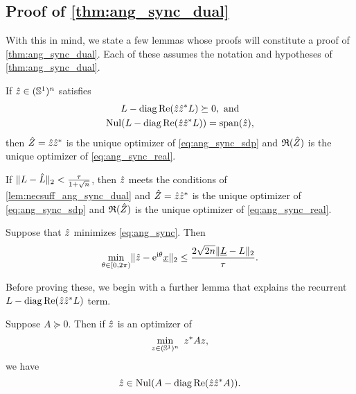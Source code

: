 \subsection{Proof of \cref{thm:ang_sync_dual}}
With this in mind, we state a few lemmas whose proofs will constitute a proof of \cref{thm:ang_sync_dual}.  Each of these assumes the notation and hypotheses of \cref{thm:ang_sync_dual}.

\begin{lemma}
  If $\hat{z} \in (\mathbb{S}^1)^n$ satisfies \begin{gather} L - \operatorname{diag}\operatorname{Re}(\hat{z} \hat{z}^* L) \succeq 0, \ \text{and} \label{eq:ang_sync_certificate} \\ \operatorname{Nul}(L - \operatorname{diag}\operatorname{Re}(\hat{z} \hat{z}^* L)) = \operatorname{span}(\hat{z}), \label{eq:ang_sync_nullspace} \end{gather} then $\hat{Z} = \hat{z} \hat{z}^*$ is the unique optimizer of \eqref{eq:ang_sync_sdp} and $\mathfrak{R}(\hat{Z})$ is the unique optimizer of \eqref{eq:ang_sync_real}.
  \label{lem:necsuff_ang_sync_dual}
\end{lemma}

\begin{lemma}
  If $\lVert L - \hat{L}\rVert_2 < \frac{\tau}{1 + \sqrt{n}}$, then $\hat{z}$ meets the conditions of \cref{lem:necsuff_ang_sync_dual} and $\hat{Z} = \hat{z} \hat{z}^*$ is the unique optimizer of \eqref{eq:ang_sync_sdp} and $\mathfrak{R}(\hat{Z})$ is the unique optimizer of \eqref{eq:ang_sync_real}.
  \label{lem:unique_ang_sync}
\end{lemma}

\begin{lemma}
  Suppose that $\hat{z}$ minimizes \eqref{eq:ang_sync}.  Then \[\min_{\theta \in [0, 2\pi)} \lVert \hat{z} - \mathrm{e}^{\mathrm{i} \theta} \underline{x} \rVert_2 \le \dfrac{2 \sqrt{2 n} \lVert\underline{L} - L\rVert_2}{\tau}.\]
    \label{lem:error_ang_sync}
\end{lemma}

Before proving these, we begin with a further lemma that explains the recurrent $L - \operatorname{diag} \operatorname{Re} (\hat{z} \hat{z}^* L)$ term.

\begin{lemma}
  Suppose $A \succeq 0$.  Then if $\hat{z}$ is an optimizer of \[\min\limits_{z \in (\mathbb{S}^1)^n} \ z^* A z,\] we have \[\hat{z} \in \operatorname{Nul} (A - \operatorname{diag} \operatorname{Re} (\hat{z} \hat{z}^* A)).\] \label{lem:first_order_cond}  
\end{lemma}

